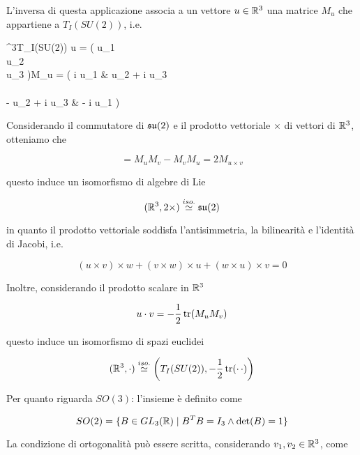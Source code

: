 L'inversa di questa applicazione associa a un vettore $ u \in \mathbb{R}^{3} $ una matrice $ M_{u} $ che appartiene a $ T_{I}(SU(2)) $, i.e.

%
	{\R^{3}}{T_{I}(SU(2))}%
	{u = \mqty( u_{1} \\ u_{2} \\ u_{3} )}{M_{u} = \mqty( i u_{1} & u_{2} + i u_{3} \\\\ - u_{2} + i u_{3} & - i u_{1} )}

Considerando il commutatore di $ \mathfrak{su}(2) $ e il prodotto vettoriale $ \times $ di vettori di $ \mathbb{R}^{3} $, otteniamo che

\begin{equation}
	[M_{u},M_{v}] = M_{u} M_{v} - M_{v} M_{u} = 2 M_{u \times v}
\end{equation}

questo induce un isomorfismo di algebre di Lie

\begin{equation}
	(\mathbb{R}^{3}, 2 \times) \stackrel{iso.}{\simeq} \mathfrak{su}(2)
\end{equation}

in quanto il prodotto vettoriale soddisfa l'antisimmetria, la bilinearità e l'identità di Jacobi, i.e.

\begin{equation}
	(u \times v) \times w + (v \times w) \times u + (w \times u) \times v = 0
\end{equation}

Inoltre, considerando il prodotto scalare in $ \mathbb{R}^{3} $

\begin{equation}
	u \cdot v = - \dfrac{1}{2} \tr(M_{u} M_{v})
\end{equation}

questo induce un isomorfismo di spazi euclidei

\begin{equation}
	(\mathbb{R}^{3},\cdot) \stackrel{iso.}{\simeq} \left( T_{I}(SU(2)), -\dfrac{1}{2} \tr(\cdot \, \cdot) \right)
\end{equation}

Per quanto riguarda $ SO(3) $: l'insieme è definito come

\begin{equation}
	SO(2) = \{ B \in GL_{3}(\mathbb{R}) \mid B^{T} B = I_{3} \wedge \det(B) = 1 \}
\end{equation}

La condizione di ortogonalità può essere scritta, considerando $ v_{1},v_{2} \in \mathbb{R}^{3} $, come

